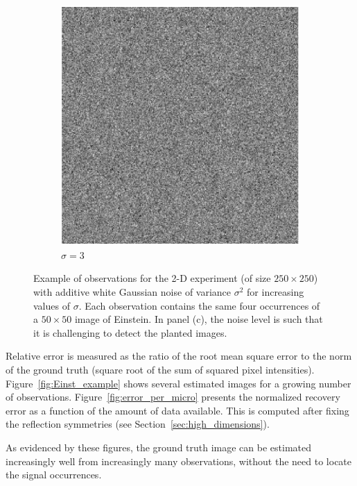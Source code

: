\documentclass[12pt]{article}
\newcommand{\1}{\mathbf{1}}
\theoremstyle{plain}
\theoremstyle{definition}
\theoremstyle{remark}
\theoremstyle{plain}
\theoremstyle{remark}
\theoremstyle{plain}
\theoremstyle{plain}
\theoremstyle{plain}
\numberwithin{equation}{section}
\begin{document}
\begin{figure}[t]
\begin{subfigure}[h]{0.33\linewidth}
		\centering
		\includegraphics[width=.8\linewidth]{micrograph_Einstein_example_s3}
		\caption{$\sigma = 3$}
	\end{subfigure}
	\caption{\label{fig:micro_example} Example of observations for the 2-D experiment (of size $250\times 250$) with additive white Gaussian noise of variance $\sigma^2$ for increasing values of $\sigma$. Each observation contains the same four occurrences of a $50 \times 50$ image of Einstein. In panel (c), the noise level is such that it is challenging to detect  the planted images.} %
\end{figure}

Relative error is measured as the ratio of the root mean square error to the norm of the ground truth (square root of the sum of squared pixel intensities). Figure~\ref{fig:Einst_example} shows several estimated images for a growing number of observations. Figure~\ref{fig:error_per_micro} presents the normalized recovery error as a function of the amount of data available.  This is computed after fixing the reflection symmetries (see Section~\ref{sec:high_dimensions}).

As evidenced by these figures, the ground truth image can be estimated increasingly well from increasingly many observations, without the need to locate the signal occurrences.
\end{document}
